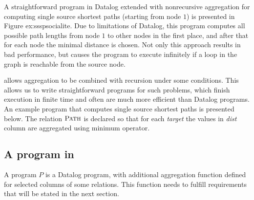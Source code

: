 A straightforward program in Datalog extended with nonrecursive aggregation for computing single source shortest paths (starting from node $1$) is presented in Figure {ex:ssspsocialite}. Due to limitations of Datalog, this program computes all possible path lengths from node $1$ to other nodes in the first place, and after that for each node the minimal distance is chosen. Not only this approach results in bad performance, but causes the program to execute infinitely if a loop in the graph is reachable from the source node.


\datalogra allows aggregation to be combined with recursion under some conditions. This allows us to write straightforward programs for such problems, which finish execution in finite time and often are much more efficient than Datalog programs. An example \datalogra program that computes single source shortest paths is presented below. The relation $\textsc{Path}$ is declared so that for each \textit{target} the values in \textit{dist} column are aggregated using minimum operator.




\subsection{A program in \datalogra}
A \datalogra program $P$ is a Datalog program, with additional aggregation function defined for selected columns of some relations. This function needs to fulfill requirements that will be stated in the next section.

